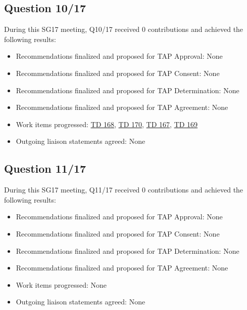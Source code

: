 \subsection{Question 10/17}

During this SG17 meeting, Q10/17 received 0 contributions and achieved the following results:

\begin{itemize}
  \item Recommendations finalized and proposed for TAP Approval: None
  \item Recommendations finalized and proposed for TAP Consent: None
  \item Recommendations finalized and proposed for TAP Determination: None
  \item Recommendations finalized and proposed for TAP Agreement: None
  \item Work items progressed: \href{https://www.itu.int/md/meetingdoc.asp?lang=en\&parent=T25-SG17-260402-TD-WP1-0168}{TD 168}, \href{https://www.itu.int/md/meetingdoc.asp?lang=en\&parent=T25-SG17-260402-TD-WP1-0170}{TD 170}, \href{https://www.itu.int/md/meetingdoc.asp?lang=en\&parent=T25-SG17-260402-TD-WP1-0167}{TD 167}, \href{https://www.itu.int/md/meetingdoc.asp?lang=en\&parent=T25-SG17-260402-TD-WP1-0169}{TD 169}
  \item Outgoing liaison statements agreed: None
\end{itemize}

\subsection{Question 11/17}

During this SG17 meeting, Q11/17 received 0 contributions and achieved the following results:

\begin{itemize}
  \item Recommendations finalized and proposed for TAP Approval: None
  \item Recommendations finalized and proposed for TAP Consent: None
  \item Recommendations finalized and proposed for TAP Determination: None
  \item Recommendations finalized and proposed for TAP Agreement: None
  \item Work items progressed: None
  \item Outgoing liaison statements agreed: None
\end{itemize}

